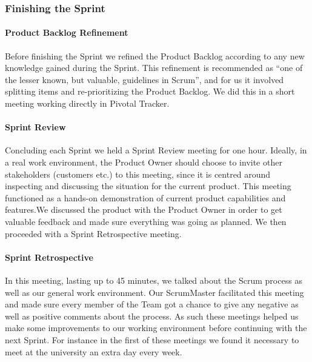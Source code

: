 \subsubsection{Finishing the Sprint}

\paragraph{Product Backlog Refinement}
Before finishing the Sprint we refined the Product Backlog according to any new knowledge gained during the Sprint. This refinement is recommended as ``one of the lesser known, but valuable, guidelines in Scrum''\cite{ScrumPrimer2}, and for us it involved splitting items and re-prioritizing the Product Backlog. We did this in a short meeting working directly in Pivotal Tracker.

\paragraph{Sprint Review}
Concluding each Sprint we held a Sprint Review meeting for one hour. Ideally, in a real work environment, the Product Owner should choose to invite other stakeholders (customers etc.) to this meeting, since it is centred around inspecting and discussing the situation for the current product. This meeting functioned as a hands-on demonstration of current product capabilities and features.We discussed the product with the Product Owner in order to get valuable feedback and made sure everything was going as planned. We then proceeded with a Sprint Retrospective meeting.

\paragraph{Sprint Retrospective}
In this meeting, lasting up to 45 minutes, we talked about the Scrum process as well as our general work environment. Our ScrumMaster facilitated this meeting and made sure every member of the Team got a chance to give any negative as well as positive comments about the process. As such these meetings helped us make some improvements to our working environment before continuing with the next Sprint. For instance in the first of these meetings we found it necessary to meet at the university an extra day every week.